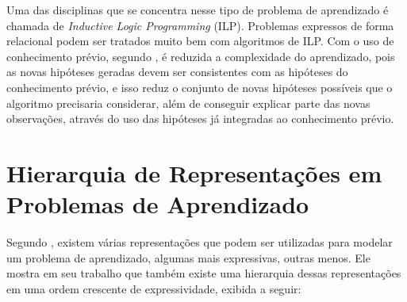 Uma das disciplinas que se concentra nesse tipo de problema de aprendizado é chamada de \textit{Inductive Logic Programming} (ILP). Problemas expressos de forma relacional podem ser tratados muito bem com algoritmos de ILP. Com o uso de conhecimento prévio, segundo \citet{AIMA}, é reduzida a complexidade do aprendizado, pois as novas hipóteses geradas devem ser consistentes com as hipóteses do conhecimento prévio, e isso reduz o conjunto de novas hipóteses possíveis que o algoritmo precisaria considerar, além de conseguir explicar parte das novas observações, através do uso das hipóteses já integradas ao conhecimento prévio.

\section{Hierarquia de Representações em Problemas de Aprendizado}
\label{sec:fundamentos}

Segundo \citet{Raedt2008}, existem várias representações que podem ser utilizadas para modelar um problema de aprendizado, algumas mais expressivas, outras menos. Ele mostra em seu trabalho que também existe uma hierarquia dessas representações em uma ordem crescente de expressividade, exibida a seguir:

